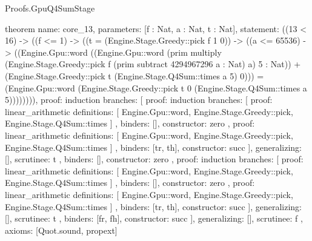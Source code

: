 \begin{lexlean}{Proofs.GpuQ4SumStage}
\begin{semanticmodule}
theorem{
  name: core_13,
  parameters: [f : Nat, a : Nat, t : Nat],
  statement: ((13 < 16) -> ((f <= 1) -> ((t = (Engine.Stage.Greedy::pick f 1 0)) -> ((a <= 65536) -> ((Engine.Gpu::word ((Engine.Gpu::word (prim multiply (Engine.Stage.Greedy::pick f (prim subtract 4294967296 a : Nat) a) 5 : Nat)) + (Engine.Stage.Greedy::pick t (Engine.Stage.Q4Sum::times a 5) 0))) = (Engine.Gpu::word (Engine.Stage.Greedy::pick t 0 (Engine.Stage.Q4Sum::times a 5)))))))),
  proof: induction{
    branches: [
      {
        proof: induction{
          branches: [
            {
              proof: linear_arithmetic{
                definitions: [
                  Engine.Gpu::word,
                  Engine.Stage.Greedy::pick,
                  Engine.Stage.Q4Sum::times
                ]
              },
              binders: [],
              constructor: zero
            },
            {
              proof: linear_arithmetic{
                definitions: [
                  Engine.Gpu::word,
                  Engine.Stage.Greedy::pick,
                  Engine.Stage.Q4Sum::times
                ]
              },
              binders: [tr, th],
              constructor: succ
            }
          ],
          generalizing: [],
          scrutinee: t
        },
        binders: [],
        constructor: zero
      },
      {
        proof: induction{
          branches: [
            {
              proof: linear_arithmetic{
                definitions: [
                  Engine.Gpu::word,
                  Engine.Stage.Greedy::pick,
                  Engine.Stage.Q4Sum::times
                ]
              },
              binders: [],
              constructor: zero
            },
            {
              proof: linear_arithmetic{
                definitions: [
                  Engine.Gpu::word,
                  Engine.Stage.Greedy::pick,
                  Engine.Stage.Q4Sum::times
                ]
              },
              binders: [tr, th],
              constructor: succ
            }
          ],
          generalizing: [],
          scrutinee: t
        },
        binders: [fr, fh],
        constructor: succ
      }
    ],
    generalizing: [],
    scrutinee: f
  },
  axioms: [Quot.sound, propext]
}


\end{semanticmodule}
\end{lexlean}
